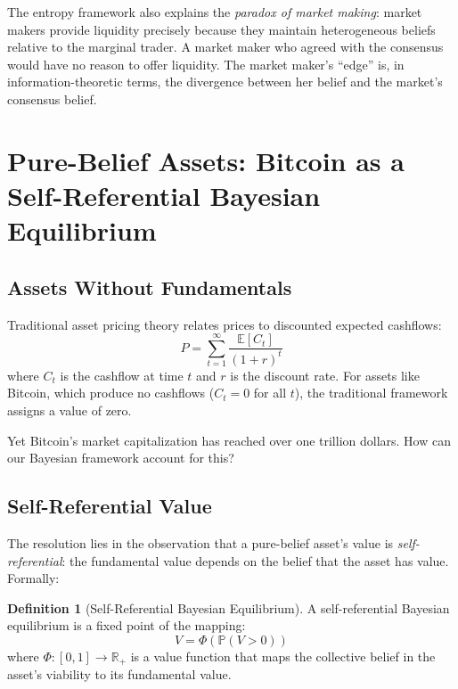 \documentclass[12pt,a4paper]{article}
\theoremstyle{definition}
\newtheorem{definition}[theorem]{Definition}
\newcommand{\E}{\mathbb{E}}
\newcommand{\Prob}{\mathbb{P}}
\newcommand{\R}{\mathbb{R}}
\begin{document}
The entropy framework also explains the \emph{paradox of market making}: market makers provide liquidity precisely because they maintain heterogeneous beliefs relative to the marginal trader. A market maker who agreed with the consensus would have no reason to offer liquidity. The market maker's ``edge'' is, in information-theoretic terms, the divergence between her belief and the market's consensus belief.



\section{Pure-Belief Assets: Bitcoin as a Self-Referential Bayesian Equilibrium}\label{sec:pure_belief}

\subsection{Assets Without Fundamentals}

Traditional asset pricing theory relates prices to discounted expected cashflows:
\begin{equation}\label{eq:dcf}
    P = \sum_{t=1}^{\infty} \frac{\E[C_t]}{(1+r)^t}
\end{equation}
where $C_t$ is the cashflow at time $t$ and $r$ is the discount rate. For assets like Bitcoin, which produce no cashflows ($C_t = 0$ for all $t$), the traditional framework assigns a value of zero.

Yet Bitcoin's market capitalization has reached over one trillion dollars. How can our Bayesian framework account for this?

\subsection{Self-Referential Value}

The resolution lies in the observation that a pure-belief asset's value is \emph{self-referential}: the fundamental value depends on the belief that the asset has value. Formally:

\begin{definition}[Self-Referential Bayesian Equilibrium]\label{def:self_ref}
A self-referential Bayesian equilibrium is a fixed point of the mapping:
\begin{equation}\label{eq:self_ref}
    V = \Phi\left(\Prob(V > 0)\right)
\end{equation}
where $\Phi: [0,1] \to \R_+$ is a value function that maps the collective belief in the asset's viability to its fundamental value.
\end{definition}
\end{document}
